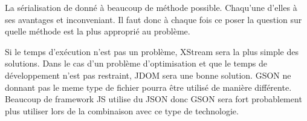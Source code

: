 \documentclass[]{article}
\begin{document}
La sérialisation de donné à beaucoup de méthode possible. Chaqu'une
d'elles à ses avantages et inconveniant. Il faut donc à chaque fois ce
poser la question sur quelle méthode est la plus approprié au problème.

Si le temps d'exécution n'est pas un problème, XStream sera la plus
simple des solutions. Dans le cas d'un problème d'optimisation et que le
temps de développement n'est pas restraint, JDOM sera une bonne
solution. GSON ne donnant pas le meme type de fichier pourra être
utilisé de manière différente. Beaucoup de framework JS utilise du JSON
donc GSON sera fort probablement plus utiliser lors de la combinaison
avec ce type de technologie.
\end{document}
